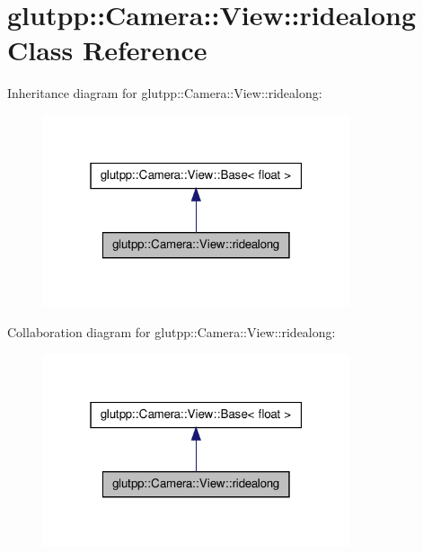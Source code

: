 \hypertarget{classglutpp_1_1Camera_1_1View_1_1ridealong}{\section{glutpp\-:\-:\-Camera\-:\-:\-View\-:\-:ridealong \-Class \-Reference}
\label{classglutpp_1_1Camera_1_1View_1_1ridealong}
}


\-Inheritance diagram for glutpp\-:\-:\-Camera\-:\-:\-View\-:\-:ridealong\-:\nopagebreak
\begin{figure}[H]
\begin{center}
\leavevmode
\includegraphics[width=256pt]{classglutpp_1_1Camera_1_1View_1_1ridealong__inherit__graph}
\end{center}
\end{figure}


\-Collaboration diagram for glutpp\-:\-:\-Camera\-:\-:\-View\-:\-:ridealong\-:\nopagebreak
\begin{figure}[H]
\begin{center}
\leavevmode
\includegraphics[width=256pt]{classglutpp_1_1Camera_1_1View_1_1ridealong__coll__graph}
\end{center}
\end{figure}
